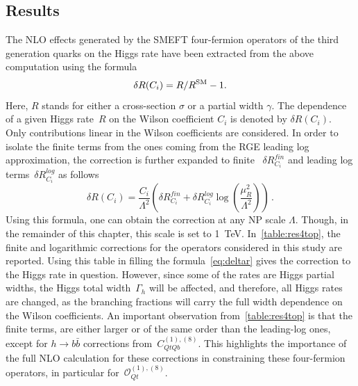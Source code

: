 	\subsection{Results}
	The NLO effects generated by the SMEFT four-fermion operators of the third generation quarks on the Higgs rate have been extracted from the above computation using the formula
	\begin{equation}
		\delta R(C_i) = R/R^{\mathrm{SM}} -1.
		\label{eq:deltaR}
	\end{equation}
	Here, $R$ stands for either a cross-section $\sigma$ or a partial width $\gamma$. The dependence of a given Higgs rate~$R$ on the Wilson coefficient $C_i$ is denoted by $\delta R(C_i) $.  Only contributions linear in the Wilson coefficients are considered. In order to isolate the finite terms from the ones coming from the RGE leading log approximation, the correction is further expanded to finite ~$\delta R_{C_i}^{fin}$ and leading log terms~$\delta R_{C_i}^{log}$ as follows
	\begin{equation}
		\delta R(C_i)= \frac{C_i}{\Lambda^2}\left(\delta R_{C_i}^{fin}+ \delta R_{C_i}^{log} \log\left(\frac{\mu_R^2}{\Lambda^2}\right)\right)\,.
		\label{eq:deltar}
	\end{equation}
	Using this formula, one can obtain the correction at any NP scale $\Lambda$. Though, in the remainder of this chapter, this scale is set to \SI{1}{TeV}. In~\autoref{table:res4top}, the finite and logarithmic corrections for the operators considered in this study are reported. Using this table in filling the formula~\eqref{eq:deltar} gives the correction to the Higgs rate in question.  However, since some of the rates are Higgs partial widths, the Higgs total width~$\Gamma_h$ will be affected, and therefore, all Higgs rates are changed, as the branching fractions will carry the full width dependence on the Wilson coefficients.
	An important observation from~\autoref{table:res4top} is that the finite terms, are either larger or of the same order than the leading-log ones, except for $h\to b\bar{b}$ corrections from~$C_{QtQb}^{(1),(8)}$. This highlights the importance of the full NLO calculation for these corrections in constraining these four-fermion operators, in particular for~$\mathcal O_{Qt}^{(1),(8)}$.
	
